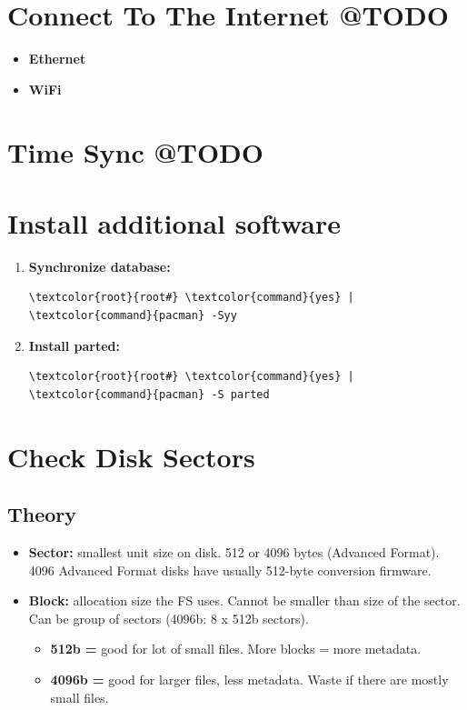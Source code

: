 \documentclass[10pt, a4paper, onecolumn, oneside, titlepage, openany]{book}
\begin{document}
\section{Connect To The Internet @TODO}
\begin{itemize}
    \item \textbf{Ethernet}

    \item \textbf{WiFi}
\end{itemize}

\section{Time Sync @TODO}

\section{Install additional software}
\begin{enumerate}
    \item \textbf{Synchronize database:}
\begin{Verbatim}[commandchars=\\\{\}]
\textcolor{root}{root#} \textcolor{command}{yes} | \textcolor{command}{pacman} -Syy
\end{Verbatim}
    \item \textbf{Install parted:}
\begin{Verbatim}[commandchars=\\\{\}]
\textcolor{root}{root#} \textcolor{command}{yes} | \textcolor{command}{pacman} -S parted
\end{Verbatim}
\end{enumerate}

\section{Check Disk Sectors}
\subsection{Theory}
\begin{itemize}
    \item \textbf{Sector:} smallest unit size on disk. 512 or 4096 bytes (Advanced Format). 4096 Advanced Format disks have usually 512-byte conversion firmware.
    \item \textbf{Block:} allocation size the FS uses. Cannot be smaller than size of the sector. Can be group of sectors (4096b: 8 x 512b sectors).
    \begin{itemize}
        \item \textbf{512b =} good for lot of small files. More blocks = more metadata.
        \item \textbf{4096b =}  good for larger files, less metadata. Waste if there are mostly small files.
    \end{itemize}
\end{itemize}
\end{document}
